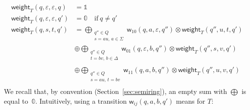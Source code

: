 \documentclass[runningheads]{llncs}
\newcommand{\zero}{\mathbb{0}}
\newcommand{\one}{\mathbb{1}}
\def\weight{\mathsf{weight}}
\def\wei{\mathsf{w}}
\def\final{\mathsf{out}}
\begin{document}
\begin{align}
\weight_T(q, \varepsilon, \varepsilon, q)  & = \one \label{eq:SWT-weight}\\ %
\weight_T(q, \varepsilon, \varepsilon, q') & = \zero \quad \mathrm{if~} q \neq q'\nonumber\\
\weight_T(q, s, t, q') & = \displaystyle\bigoplus_{\begin{array}{c}
                                                   \scriptstyle q'' \in Q\\
                                                   \scriptstyle s = au,\, a \in \Sigma
                                                   \end{array}} 
    \wei_{10}(q, a, \varepsilon, q'') \otimes \weight_T(q'', u, t, q')\nonumber\\
                    & \oplus \displaystyle\bigoplus_{\begin{array}{c}
                                                     \scriptstyle q'' \in Q\\ 
                                                     \scriptstyle t = bv,\, b \in \Delta\\
                                                     \end{array}} 
    \wei_{01}(q, \varepsilon, b, q'') \otimes \weight_T(q'', s, v, q')\nonumber\\
                    & \oplus \displaystyle\bigoplus_{\begin{array}{c}
                                                     \scriptstyle q'' \in Q\\
                                                     \scriptstyle s = au,\, t = bv\\
                                                     \end{array}} 
    \wei_{11}(q, a, b, q'') \otimes \weight_T(q'', u, v, q')\nonumber
\end{align}
%
We recall that, by convention (Section~\ref{sec:semiring}), 
an empty sum with $\bigoplus$ is equal to~$\zero$. 
%
Intuitively, using a transition $\wei_{ij}(q, a, b, q')$ means for $T$:
\end{document}
